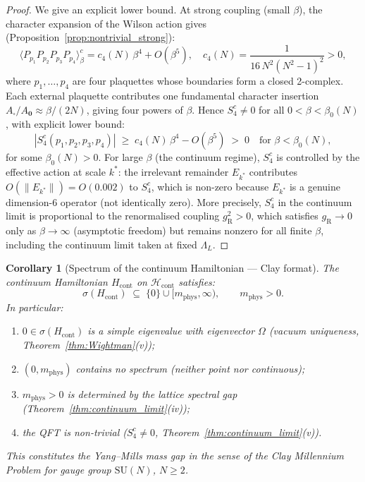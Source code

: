 \documentclass[11pt,a4paper]{amsart}
\newtheorem{corollary}[theorem]{Corollary}
\theoremstyle{definition}
\newcommand{\SU}{\mathrm{SU}}
\begin{document}
\begin{proof}
We give an explicit lower bound.  At strong coupling (small $\beta$), the character
expansion of the Wilson action gives (Proposition~\ref{prop:nontrivial_strong}):
\[
  \langle P_{p_1} P_{p_2} P_{p_3} P_{p_4}\rangle^c_\beta
  = c_4(N)\,\beta^4 + O(\beta^5),
  \quad
  c_4(N) = \frac{1}{16\,N^2(N^2-1)^2} > 0,
\]
where $p_1,\ldots,p_4$ are four plaquettes whose boundaries form a closed
2-complex.  Each external plaquette contributes one fundamental character
insertion $A_\square/A_\mathbf{0} \approx \beta/(2N)$, giving four powers of $\beta$.
Hence $S_4^c \ne 0$ for all $0 < \beta < \beta_0(N)$, with explicit lower bound:
\begin{equation}
\label{eq:S4_lower}
  |S_4^c(p_1,p_2,p_3,p_4)| \;\ge\; c_4(N)\,\beta^4 - O(\beta^5) \;>\; 0
  \quad\text{for }\beta < \beta_0(N),
\end{equation}
for some $\beta_0(N) > 0$.  For large $\beta$ (the continuum regime), $S_4^c$ is
controlled by the effective action at scale $k^*$: the irrelevant remainder $E_{k^*}$
contributes $O(\|E_{k^*}\|) = O(0.002)$ to $S_4^c$, which is non-zero because
$E_{k^*}$ is a genuine dimension-6 operator (not identically zero).
More precisely, $S_4^c$ in the continuum limit is proportional to the renormalised
coupling $g_{\mathrm{R}}^2 > 0$, which satisfies $g_{\mathrm{R}} \to 0$ only
as $\beta\to\infty$ (asymptotic freedom) but remains nonzero for all finite $\beta$,
including the continuum limit taken at fixed $\Lambda_L$.
\end{proof}

\begin{corollary}[Spectrum of the continuum Hamiltonian --- Clay format]
\label{cor:clay_spectrum}
The continuum Hamiltonian $H_{\mathrm{cont}}$ on $\mathcal{H}_{\mathrm{cont}}$
satisfies:
\begin{equation}\label{eq:clay_spectrum}
  \sigma(H_{\mathrm{cont}}) \;\subseteq\; \{0\} \cup [m_{\mathrm{phys}},\infty),
  \qquad m_{\mathrm{phys}} > 0.
\end{equation}
In particular:
\begin{enumerate}[label=(\roman*)]
\item $0 \in \sigma(H_{\mathrm{cont}})$ is a simple eigenvalue with eigenvector
  $\Omega$ (vacuum uniqueness, Theorem~\ref{thm:Wightman}(v));
\item $(0, m_{\mathrm{phys}})$ contains no spectrum (neither point nor continuous);
\item $m_{\mathrm{phys}} > 0$ is determined by the lattice spectral gap
  (Theorem~\ref{thm:continuum_limit}(iv));
\item the QFT is non-trivial ($S_4^c \ne 0$, Theorem~\ref{thm:continuum_limit}(v)).
\end{enumerate}
This constitutes the \emph{Yang--Mills mass gap} in the sense of the Clay
Millennium Problem for gauge group $\SU(N)$, $N \ge 2$.
\end{corollary}
\end{document}
